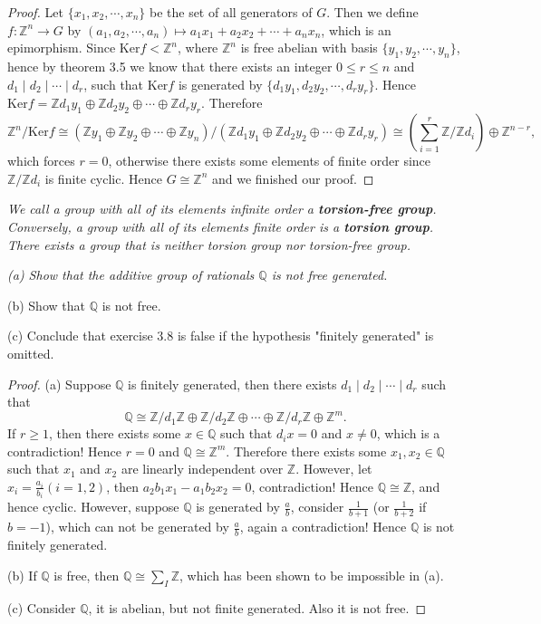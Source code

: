 \begin{proof}
Let $\{x_1,x_2,\cdots,x_n\}$ be the set of all generators of $G$. Then we define $f:\mathbb{Z}^n\to G$ by $(a_1,a_2,\cdots,a_n)\mapsto a_1x_1+a_2x_2+\cdots+a_nx_n$, which is an epimorphism. Since $\mathrm{Ker}f<\mathbb{Z}^n$, where $\mathbb{Z}^n$ is free abelian with basis $\{y_1,y_2,\cdots,y_n\}$, hence by theorem 3.5 we know that there exists an integer $0\le r\le n$ and $d_1\mid d_2\mid\cdots\mid d_r$, such that $\mathrm{Ker}f$ is generated by $\{d_1y_1,d_2y_2,\cdots,d_ry_r\}$. Hence $\mathrm{Ker}f=\mathbb{Z} d_1y_1\oplus \mathbb{Z} d_2y_2\oplus \cdots \oplus \mathbb{Z} d_ry_r.$
Therefore 
$$
\mathbb{Z} ^n/\mathrm{Ker}f\cong \left( \mathbb{Z} y_1\oplus \mathbb{Z} y_2\oplus \cdots \oplus \mathbb{Z} y_n \right) /\left( \mathbb{Z} d_1y_1\oplus \mathbb{Z} d_2y_2\oplus \cdots \oplus \mathbb{Z} d_ry_r \right) \cong \left( \sum_{i=1}^r{\mathbb{Z} /\mathbb{Z} d_i} \right) \oplus \mathbb{Z} ^{n-r},
$$
which forces $r=0$, otherwise there exists some elements of finite order since $\mathbb{Z}/\mathbb{Z}d_i$ is finite cyclic. Hence $G\cong\mathbb{Z}^n$ and we finished our proof.
\end{proof}
\begin{note}\em
We call a group with all of its elements infinite order a \textbf{torsion-free group}. Conversely, a group with all of its elements finite order is a \textbf{torsion group}. There exists a group that is neither torsion group nor torsion-free group. 
\end{note}
\begin{problem}\em
(a) Show that the additive group of rationals $\mathbb{Q}$ is not free generated.\par
(b) Show that $\mathbb{Q}$ is not free.\par
(c) Conclude that exercise 3.8 is false if the hypothesis "finitely generated" is omitted.
\end{problem}
\begin{proof}
(a) Suppose $\mathbb{Q}$ is finitely generated, then there exists $d_1\mid d_2\mid\cdots\mid d_r$ such that 
$$
\mathbb{Q} \cong \mathbb{Z} /d_1\mathbb{Z} \oplus \mathbb{Z} /d_2\mathbb{Z} \oplus \cdots \oplus \mathbb{Z} /d_r\mathbb{Z} \oplus \mathbb{Z} ^m.
$$
If $r\ge 1$, then there exists some $x\in\mathbb{Q}$ such that $d_ix=0$ and $x\ne 0$, which is a contradiction! Hence $r=0$ and $\mathbb{Q}\cong\mathbb{Z}^m$. Therefore there exists some $x_1,x_2\in\mathbb{Q}$ such that $x_1$ and $x_2$ are linearly independent over $\mathbb{Z}$. However, let $x_i=\frac{a_i}{b_i}(i=1,2)$, then $a_2b_1x_1-a_1b_2x_2=0$, contradiction! Hence $\mathbb{Q}\cong\mathbb{Z}$, and hence cyclic. However, suppose $\mathbb{Q}$ is generated by $\frac{a}{b}$, consider $\frac{1}{b+1}$ (or $\frac{1}{b+2}$ if $b=-1$), which can not be generated by $\frac{a}{b}$, again a contradiction! Hence $\mathbb{Q}$ is not finitely generated.\par
(b) If $\mathbb{Q}$ is free, then $\mathbb{Q}\cong\sum_{I}\mathbb{Z}$, which has been shown to be impossible in (a).\par
(c) Consider $\mathbb{Q}$, it is abelian, but not finite generated. Also it is not free.
\end{proof}
